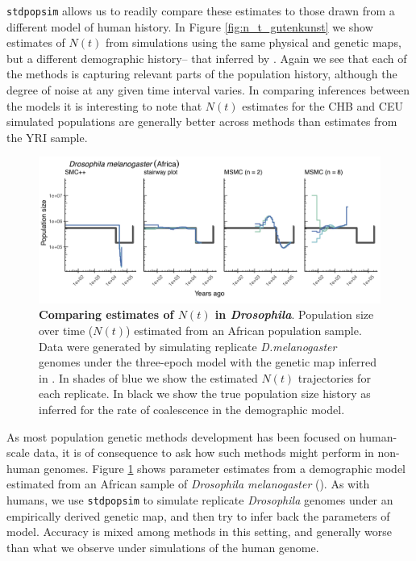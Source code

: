 \documentclass[12pt,halfline,a4paper]{ouparticle}
\newcommand{\stdpopsim}{\texttt{stdpopsim} }
\begin{document}
\stdpopsim allows us to readily compare these estimates to those drawn from a different
model of human history. In Figure \ref{fig:n_t_gutenkunst} we show estimates of
$N(t)$ from simulations using the same physical and genetic maps, but a different demographic
history-- that inferred by \cite{gutenkunst2009inferring}. Again we see that each
of the methods is capturing relevant parts of the population history, although the
degree of noise at any given time interval varies. In comparing inferences between the
models it is interesting to note that $N(t)$ estimates for the CHB and CEU
simulated populations are generally better across methods than estimates from the YRI
sample.


\begin{figure}
\begin{center}
\includegraphics[width=0.8\linewidth]{display_items/d_mel_Sheehan_mask2.png}
\caption{\textbf{Comparing estimates of $N(t)$ in \emph{Drosophila}}. Population
size over time ($N(t)$) estimated from an African population sample. Data were generated by simulating
replicate \emph{D.melanogaster} genomes under the three-epoch \cite{sheehan2016deep} model
with the genetic map inferred in \cite{comeron2012many}. In shades of blue we show the estimated
$N(t)$ trajectories for each replicate. In black we show the true population size history as inferred
for the rate of coalescence in the demographic model.}
\label{fig:n_t_sheehan}
\end{center}
\end{figure}

As most population genetic methods development has been focused on human-scale
data, it is of consequence to ask how such methods might perform in non-human
genomes. Figure \ref{fig:n_t_sheehan} shows parameter estimates from a demographic
model estimated from an African sample of \emph{Drosophila melanogaster} (\cite{sheehan2016deep}).
As with humans, we use \stdpopsim to simulate replicate \emph{Drosophila} genomes under
an empirically derived genetic map, and then try to infer back the parameters of model.
Accuracy is mixed among methods in this setting, and generally worse than what we
observe under simulations of the human genome.
\end{document}
